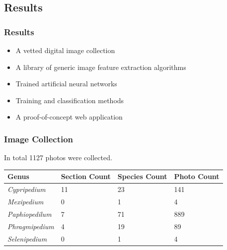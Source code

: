 \documentclass[]{beamer}
\begin{document}
    \subsection{Results}

    \begin{frame}
        \frametitle{Results}

        \begin{itemize}
            \item A vetted digital image collection
            \item A library of generic image feature extraction algorithms
            \item Trained artificial neural networks
            \item Training and classification methods
            \item A proof-of-concept web application
        \end{itemize}
    \end{frame}

    \begin{frame}[plain]
        \frametitle{Image Collection}

        In total 1127 photos were collected.

        \begin{table}[h]\scriptsize
            \begin{center}
            \begin{tabular}{llll}
            \toprule
            \textbf{Genus} & \textbf{Section Count} & \textbf{Species Count} & \textbf{Photo Count} \\
            \midrule
            \textit{Cypripedium} & 11 & 23 & 141 \\
            \textit{Mexipedium} & 0 & 1 & 4 \\
            \textit{Paphiopedilum} & 7 & 71 & 889 \\
            \textit{Phragmipedium} & 4 & 19 & 89 \\
            \textit{Selenipedium} & 0 & 1 & 4 \\
            \bottomrule
            \end{tabular}
            \end{center}
        \end{table}
    \end{frame}
\end{document}
